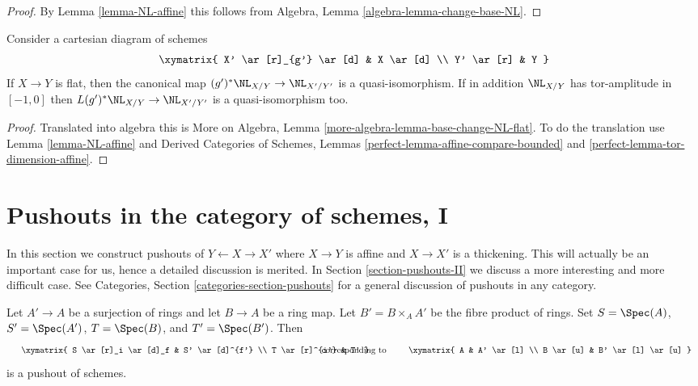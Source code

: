 \begin{proof}
By Lemma \ref{lemma-NL-affine} this follows from
Algebra, Lemma \ref{algebra-lemma-change-base-NL}.
\end{proof}

\begin{lemma}
\label{lemma-base-change-NL-flat}
Consider a cartesian diagram of schemes
$$
\xymatrix{
X' \ar[r]_{g'} \ar[d] & X \ar[d] \\
Y' \ar[r] & Y
}
$$
If $X \to Y$ is flat, then the canonical map
$(g')^*\NL_{X/Y} \to \NL_{X'/Y'}$ is a quasi-isomorphism.
If in addition $\NL_{X/Y}$ has tor-amplitude in $[-1, 0]$
then $L(g')^*\NL_{X/Y} \to \NL_{X'/Y'}$ is a quasi-isomorphism too.
\end{lemma}

\begin{proof}
Translated into algebra this is
More on Algebra, Lemma \ref{more-algebra-lemma-base-change-NL-flat}.
To do the translation use Lemma \ref{lemma-NL-affine}
and Derived Categories of Schemes, Lemmas
\ref{perfect-lemma-affine-compare-bounded} and
\ref{perfect-lemma-tor-dimension-affine}.
\end{proof}











\section{Pushouts in the category of schemes, I}
\label{section-pushouts}

\noindent
In this section we construct pushouts of $Y \leftarrow X \rightarrow X'$
where $X \to Y$ is affine and $X \to X'$ is a thickening. This will
actually be an important case for us, hence a detailed discussion is merited.
In Section \ref{section-pushouts-II} we discuss a more interesting
and more difficult case. See Categories, Section
\ref{categories-section-pushouts} for a general
discussion of pushouts in any category.

\begin{lemma}
\label{lemma-basic-example-pushout}
Let $A' \to A$ be a surjection of rings and let $B \to A$ be a ring map.
Let $B' = B \times_A A'$ be the fibre product of rings. Set
$S = \Spec(A)$, $S' = \Spec(A')$, $T = \Spec(B)$, and $T' = \Spec(B')$.
Then
$$
\vcenter{
\xymatrix{
S \ar[r]_i \ar[d]_f & S' \ar[d]^{f'} \\
T \ar[r]^{i'} & T'
}
}
\quad\text{corresponding to}\quad
\vcenter{
\xymatrix{
A & A' \ar[l] \\
B \ar[u] & B' \ar[l] \ar[u]
}
}
$$
is a pushout of schemes.
\end{lemma}

